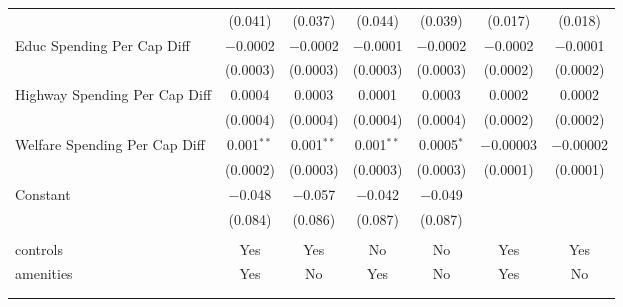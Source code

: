 \begin{table}[!htbp]
\begin{tabular}{@{\extracolsep{5pt}}lcccccc}
  & (0.041) & (0.037) & (0.044) & (0.039) & (0.017) & (0.018) \\ 
  Educ Spending Per Cap Diff & $-$0.0002 & $-$0.0002 & $-$0.0001 & $-$0.0002 & $-$0.0002 & $-$0.0001 \\ 
  & (0.0003) & (0.0003) & (0.0003) & (0.0003) & (0.0002) & (0.0002) \\ 
  Highway Spending Per Cap Diff & 0.0004 & 0.0003 & 0.0001 & 0.0003 & 0.0002 & 0.0002 \\ 
  & (0.0004) & (0.0004) & (0.0004) & (0.0004) & (0.0002) & (0.0002) \\ 
  Welfare Spending Per Cap Diff & 0.001$^{**}$ & 0.001$^{**}$ & 0.001$^{**}$ & 0.0005$^{*}$ & $-$0.00003 & $-$0.00002 \\ 
  & (0.0002) & (0.0003) & (0.0003) & (0.0003) & (0.0001) & (0.0001) \\ 
  Constant & $-$0.048 & $-$0.057 & $-$0.042 & $-$0.049 &  &  \\ 
  & (0.084) & (0.086) & (0.087) & (0.087) &  &  \\ 
 \hline \\[-1.8ex] 
controls & Yes & Yes & No & No & Yes & Yes \\ 
amenities & Yes & No & Yes & No & Yes & No \\ 
\hline \\[-1.8ex] 
\hline 
\hline \\[-1.8ex] 
\end{tabular} 
\end{table} 

